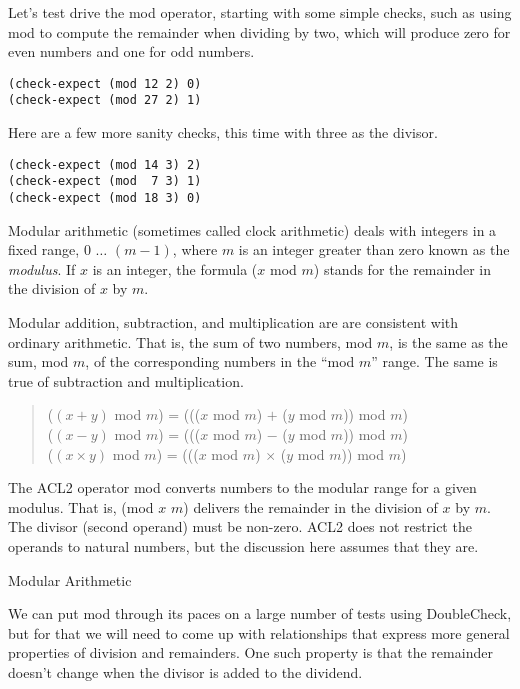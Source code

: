 Let's test drive the \textsf{mod} operator, starting with
some simple checks, such as using \textsf{mod}
to compute the remainder when dividing by two,
which will produce zero for even numbers and one for odd numbers.

\begin{Verbatim}
(check-expect (mod 12 2) 0)
(check-expect (mod 27 2) 1)
\end{Verbatim}

Here are a few more sanity checks, this time with three as the divisor.

\begin{Verbatim}
(check-expect (mod 14 3) 2)
(check-expect (mod  7 3) 1)
(check-expect (mod 18 3) 0)
\end{Verbatim}

\begin{aside}
Modular 
arithmetic
(sometimes called clock arithmetic)
deals with integers in a fixed range, $0$ $\dots$ $(m - 1)$,
where $m$ is an integer greater than zero known as
the \emph{modulus}.
If $x$ is an integer, the formula ($x$ mod $m$) stands for
the remainder in the division of $x$ by $m$.

Modular addition, subtraction, and multiplication are
are consistent with ordinary arithmetic.
That is, the sum of two numbers, mod $m$,
is the same as the sum, mod $m$, of the corresponding numbers
in the ``mod $m$'' range.
The same is true of subtraction and multiplication.

\begin{quote}
($(x + y)$ mod $m$) = ((($x$ mod $m$) $+$ ($y$ mod $m$)) mod $m$) \\
($(x - y)$ mod $m$) = ((($x$ mod $m$) $-$ ($y$ mod $m$)) mod $m$) \\
($(x \times y)$ mod $m$) = ((($x$ mod $m$) $\times$ ($y$ mod $m$)) mod $m$)
\end{quote}

The ACL2 operator \textsf{mod} converts numbers to the modular range
for a given modulus. That is, (\textsf{mod} $x$ $m$) delivers the remainder
in the division of $x$ by $m$.
The divisor (second operand) must be non-zero.
ACL2 does not restrict the operands to natural numbers,
but the discussion here assumes that they are.
\caption{Modular Arithmetic}
\label{modular-arithmetic}
\end{aside}

We can put \textsf{mod}
through its paces on a large number of tests using DoubleCheck,
but for that we will need to come up with relationships
that express more general properties of division and remainders.
One such property is that the remainder doesn't change
when the divisor is added to the dividend.

